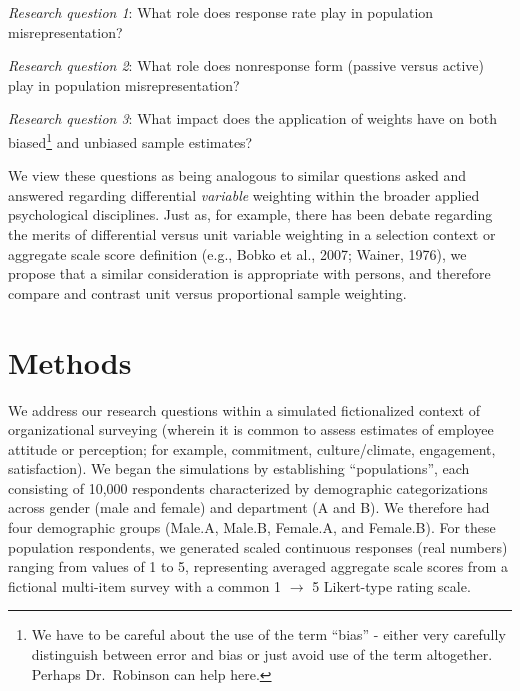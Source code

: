 \documentclass[
  man,mask]{apa7}
\begin{document}
\emph{Research question 1}: What role does response rate play in population misrepresentation?

\emph{Research question 2}: What role does nonresponse form (passive versus active) play in population misrepresentation?

\emph{Research question 3}: What impact does the application of weights have on both biased\footnote{We have to be careful about the use of the term ``bias'' - either very carefully distinguish between error and bias or just avoid use of the term altogether. Perhaps Dr.~Robinson can help here.} and unbiased sample estimates?

We view these questions as being analogous to similar questions asked and answered regarding differential \emph{variable} weighting within the broader applied psychological disciplines. Just as, for example, there has been debate regarding the merits of differential versus unit variable weighting in a selection context or aggregate scale score definition (e.g., Bobko et al., 2007; Wainer, 1976), we propose that a similar consideration is appropriate with persons, and therefore compare and contrast unit versus proportional sample weighting.

\section{Methods}\label{methods}

We address our research questions within a simulated fictionalized context of organizational surveying (wherein it is common to assess estimates of employee attitude or perception; for example, commitment, culture/climate, engagement, satisfaction). We began the simulations by establishing ``populations'', each consisting of 10,000 respondents characterized by demographic categorizations across gender (male and female) and department (A and B). We therefore had four demographic groups (Male.A, Male.B, Female.A, and Female.B). For these population respondents, we generated scaled continuous responses (real numbers) ranging from values of 1 to 5, representing averaged aggregate scale scores from a fictional multi-item survey with a common 1 \(\rightarrow\) 5 Likert-type rating scale.
\end{document}
